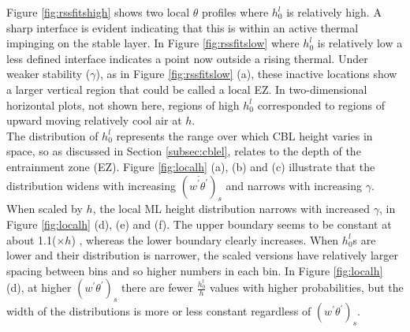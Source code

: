 

Figure \ref{fig:rssfitshigh} shows two local $\theta$ profiles where $h_{0}^{l}$ is relatively high.  
A sharp interface is evident indicating that this is within an active thermal impinging on the stable layer.
In Figure \ref{fig:rssfitslow} where $h_{0}^{l}$ is relatively low a less defined interface indicates 
a point now outside a rising thermal.  Under weaker stability ($\gamma$), as in Figure \ref{fig:rssfitslow} (a), 
these inactive locations show a larger vertical region that could be called a local \acs{EZ}.  
In two-dimensional horizontal plots, not shown here, regions of high 
$h_{0}^{l}$ corresponded to regions of upward moving relatively cool air at $h$.\\

The distribution of $h_{0}^{l}$ represents the range over which \acs{CBL} height varies in space, so as 
discussed in Section \ref{subsec:cblel}, relates to the depth of the entrainment zone (\acs{EZ}).
Figure \ref{fig:localh} (a), (b) and (c) illustrate that the distribution widens with increasing $(\overline{w^{'}\theta^{'}})_{s}$ and narrows with increasing $\gamma$.  When scaled by $h$, the local \acs{ML} height distribution 
narrows with increased $\gamma$, in Figure \ref{fig:localh} (d), (e) and (f).  The upper boundary seems to be constant at about 1.1($\times h$) , whereas the lower boundary clearly increases.  When $h_{0}^{l}$s are lower and their distribution is narrower, the scaled versions have relatively larger spacing between bins and so higher numbers in each bin. In Figure \ref{fig:localh} (d), at higher $(w^{'}\theta^{'})_{s}$ there are fewer $\frac{h_{0}^{l}}{h}$ values with higher probabilities, but the width of the distributions is more or less constant regardless of $(w^{'}\theta^{'})_{s}$.\\

